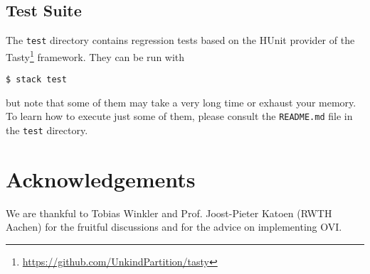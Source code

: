\documentclass[9pt,a4paper]{article}
\begin{document}
\subsection{Test Suite}
The \texttt{test} directory contains regression tests based on the HUnit
provider of the Tasty\footnote{\url{https://github.com/UnkindPartition/tasty}} framework.
They can be run with
\begin{verbatim}
$ stack test
\end{verbatim}
but note that some of them may take a very long time or exhaust your memory.
To learn how to execute just some of them, please consult the \texttt{README.md}
file in the \texttt{test} directory.

\section*{Acknowledgements}
We are thankful to Tobias Winkler and Prof. Joost-Pieter Katoen (RWTH Aachen)
for the fruitful discussions and for the advice on implementing OVI.



\end{document}

